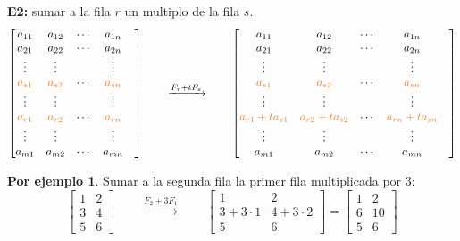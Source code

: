 \documentclass{article}
\theoremstyle{definition}
\theoremstyle{definition}
\newtheorem*{ej}{Por ejemplo}
\theoremstyle{remark}
\begin{document}
\textbf{E2:} sumar a la fila $r$ un multiplo de la fila $s$.\[
  \begin{bmatrix}
  a_{11} &   a_{12}    & \cdots & a_{1n}   \\ 
  a_{21} &   a_{22}    & \cdots & a_{2n}   \\ 
\vdots & \vdots & & \vdots & \\
\textcolor{rojop2}{a_{s1}} & \textcolor{rojop2}{a_{s2}} & \cdots  &  \textcolor{rojop2}{a_{sn}} \\
\vdots & \vdots & & \vdots \\
\textcolor{rojop2}{a_{r1}} & \textcolor{rojop2}{a_{r2}} & \cdots  &  \textcolor{rojop2}{a_{rn}} \\
\vdots & \vdots & & \vdots & \\
  a_{m1} &   a_{m2}    & \cdots & a_{mn}   \\ 
  \end{bmatrix} \quad \quad \xrightarrow{F_r + tF_{s}} \quad \quad  \begin{bmatrix}
  a_{11} &   a_{12}    & \cdots & a_{1n}   \\ 
  a_{21} &   a_{22}    & \cdots & a_{2n}   \\ 
\vdots & \vdots & & \vdots & \\
\textcolor{rojop2}{a_{s1}} & \textcolor{rojop2}{a_{s2}} & \cdots  &  \textcolor{rojop2}{a_{sn}} \\
\vdots & \vdots & & \vdots \\
\textcolor{rojop2}{a_{r1}+ta_{s1}} & \textcolor{rojop2}{a_{r2}+ta_{s2}} & \cdots  &  \textcolor{rojop2}{a_{rn}+ta_{sn}} \\
\vdots & \vdots & & \vdots & \\
  a_{m1} &   a_{m2}    & \cdots & a_{mn}   \\ 
  \end{bmatrix}
\]
\begin{ej}
  Sumar a la segunda fila la primer fila multiplicada por $3$: \[
    \begin{bmatrix}
      1 & 2 \\
      3 & 4 \\
      5 & 6 
      \end{bmatrix} \quad \quad \xrightarrow{F_2+3F_1} \quad \quad  \begin{bmatrix}
      1 & 2 \\
      3+3\cdot1 & 4+3\cdot 2 \\
      5 & 6 
    \end{bmatrix}
    =
    \begin{bmatrix}
      1 & 2 \\
      6 & 10 \\
      5 & 6
    \end{bmatrix}
  \]
\end{ej}
\end{document}

